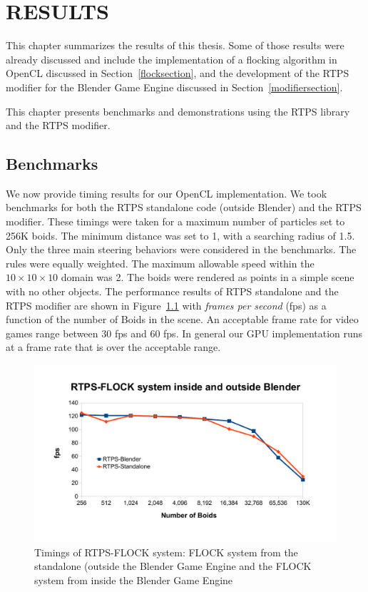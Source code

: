 \chapter{RESULTS}\label{resultsChapter}

This chapter summarizes the results of this thesis. Some of those results were already discussed and include the implementation of a flocking algorithm in OpenCL discussed in Section~\ref{flocksection}, and the development of the RTPS modifier for the Blender Game Engine discussed in Section~\ref{modifiersection}. 

This chapter presents benchmarks and demonstrations using the RTPS library and the RTPS modifier.

\section{Benchmarks}

We now provide timing results for our OpenCL implementation. We took benchmarks for both the RTPS standalone code (outside Blender) and the RTPS modifier. These timings were taken for a maximum number of particles set to 256K boids. The minimum distance was set to 1, with a searching radius of 1.5. Only the three main steering behaviors were considered in the benchmarks. The rules were equally weighted. The maximum allowable speed within the $10\times 10\times 10$ domain was 2. The boids were rendered as points in a simple scene with no other objects. The performance results of RTPS standalone and the RTPS modifier are shown in Figure~\ref{RTPSvsRTPS} with \textit{frames per second} (fps) as a function of the number of Boids in the scene. An acceptable frame rate for video games range between 30 fps and 60 fps. In general our GPU implementation runs at a frame rate that is over the acceptable range. 

\begin{figure}[htbp]
\begin{center}
\includegraphics[scale=0.7]{figures/RTPSvsRTPS.pdf}
\caption{Timings of RTPS-FLOCK system: FLOCK system from the standalone (outside the Blender Game Engine and the FLOCK system from inside the Blender Game Engine}
\label{RTPSvsRTPS}
\end{center}
\end{figure}

